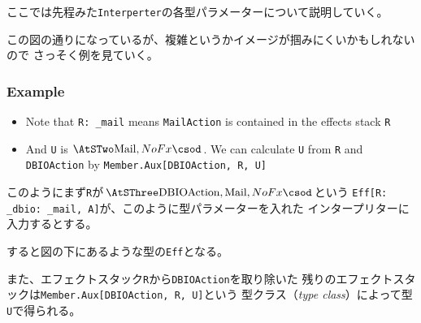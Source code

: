 \begin{frame}[fragile]
  \begin{notes}
    \item ここでは先程みた\lstinline|Interperter|の各型パラメーターについて説明していく。

    \item この図の通りになっているが、複雑というかイメージが掴みにくいかもしれないので
    さっそく例を見ていく。
  \end{notes}
\end{frame}

\begin{frame}
  \frametitle{Example}

  \begin{center}
  \end{center}

  \begin{itemize}
    \item Note that \lstinline|R: _mail| means \lstinline|MailAction| is
    contained in the effects stack \lstinline|R|

    \item And \lstinline|U| is $\STwo{\lstinline|Mail|,NoFx}$.
    We can calculate \lstinline|U| from \lstinline|R| and \lstinline|DBIOAction|
    by \lstinline|Member.Aux[DBIOAction, R, U]|
  \end{itemize}

  \begin{notes}
    \item このようにまず\lstinline|R|が$\SThree{\lstinline|DBIOAction|,\lstinline|Mail|,NoFx}$という
    \lstinline|Eff[R: _dbio: _mail, A]|が、このように型パラメーターを入れた
    インタープリターに入力するとする。

    \item すると図の下にあるような型の\lstinline|Eff|となる。

    \item また、エフェクトスタック\lstinline|R|から\lstinline|DBIOAction|を取り除いた
    残りのエフェクトスタックは\lstinline|Member.Aux[DBIOAction, R, U]|という
    型クラス（\emph{type class}）によって型\lstinline|U|で得られる。
  \end{notes}
\end{frame}

